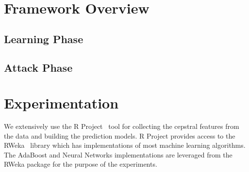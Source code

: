 \documentclass[11pt,conference]{IEEEtran}
\begin{document}
\begin{table}[h]
\centering
{%
{}
}
\caption{Test accuracies with and without FFT features using AdaBoost with RandomForests.}
\label{tab:ffts-non-ffts}
\end{table}

\section{Framework Overview}
\subsection{Learning Phase}
\subsection{Attack Phase}

\section{Experimentation}
\label{sec:experimentation}
\noindent We extensively use the R Project~\cite{r-project} tool for collecting the
cepstral features from the data and building the prediction models. R Project
provides access to the RWeka~\cite{rweka} library which has implementations
of most machine learning algorithms. The AdaBoost and Neural Networks implementations
are leveraged from the RWeka package for the purpose of the experiments.
\end{document}
